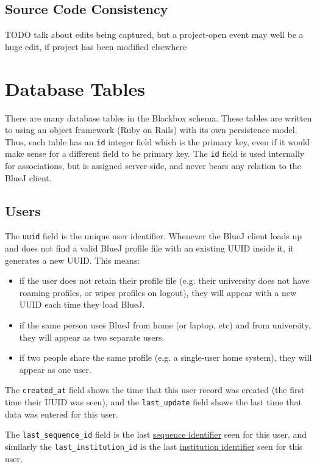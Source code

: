 \documentclass{book}
\begin{document}
\section{Source Code Consistency}

TODO talk about edits being captured, but a project-open event may well be a
huge edit, if project has been modified elsewhere

\chapter{Database Tables}

There are many database tables in the Blackbox schema.  These tables are
written to using an object framework (Ruby on Rails) with its own persistence
model.  Thus, each table has an \verb$id$ integer field which is the primary
key, even if it would make sense for a different field to be primary key.  The
\texttt{id} field is used internally for associations, but is assigned
server-side, and never bears any relation to the BlueJ client.

\section{Users}

The \texttt{uuid} field is the unique user identifier.  Whenever the BlueJ
client loads up and does not find a valid BlueJ profile file with an existing
UUID inside it, it generates a new UUID.  This means:

\begin{itemize}
\item if the user does not retain their profile file (e.g. their university
  does not have roaming profiles, or wipes profiles on logout), they will
  appear with a new UUID each time they load BlueJ.
\item if the same person uses BlueJ from home (or laptop, etc) and from
  university, they will appear as two separate users.
\item if two people share the same profile (e.g. a single-user home system),
  they will appear as one user.
\end{itemize}

The \texttt{created\_at} field shows the time that this user record was
created (the first time their UUID was seen), and the \texttt{last\_update} field shows the last time that data was entered for
this user.

The \texttt{last\_sequence\_id} field is the last \hyperref[def:sequence_id]{sequence identifier} seen for
this user, and similarly the \texttt{last\_institution\_id} is the last
\hyperref[def:institution_id]{institution identifier} seen for this user.
\end{document}
